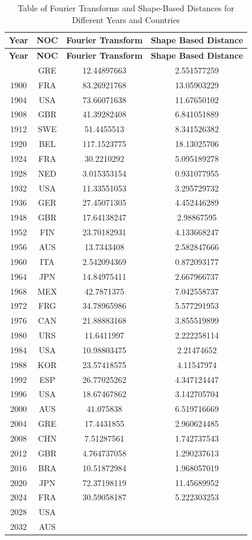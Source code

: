\documentclass[12pt]{article}
\begin{document}
\begin{longtable}{|c|c|c|c|}
\caption{Table of Fourier Transforms and Shape-Based Distances for Different Years and Countries}\\
\hline
\textbf{Year} & \textbf{NOC} & \textbf{Fourier Transform} & \textbf{Shape Based Distance} \\
\hline
\endfirsthead
\hline
\textbf{Year} & \textbf{NOC} & \textbf{Fourier Transform} & \textbf{Shape Based Distance} \\
\hline
\endhead
\hline
\endfoot
1896 & GRE & 12.44897663 & 2.551577259 \\
1900 & FRA & 83.26921768 & 13.05903229 \\
1904 & USA & 73.66071638 & 11.67650102 \\
1908 & GBR & 41.39282408 & 6.841051889 \\
1912 & SWE & 51.4455513 & 8.341526382 \\
1920 & BEL & 117.1523775 & 18.13025706 \\
1924 & FRA & 30.2210292 & 5.095189278 \\
1928 & NED & 3.015353154 & 0.931077955 \\
1932 & USA & 11.33551053 & 3.295729732 \\
1936 & GER & 27.45071305 & 4.452446289 \\
1948 & GBR & 17.64138247 & 2.98867595 \\
1952 & FIN & 23.70182931 & 4.133668247 \\
1956 & AUS & 13.7343408 & 2.582847666 \\
1960 & ITA & 2.542094369 & 0.872093177 \\
1964 & JPN & 14.84975411 & 2.667966737 \\
1968 & MEX & 42.7871375 & 7.042558737 \\
1972 & FRG & 34.78965986 & 5.577291953 \\
1976 & CAN & 21.88883168 & 3.855519899 \\
1980 & URS & 11.6411997 & 2.222258114 \\
1984 & USA & 10.98803475 & 2.21474652 \\
1988 & KOR & 23.57418575 & 4.11547974 \\
1992 & ESP & 26.77025262 & 4.347124447 \\
1996 & USA & 18.67467862 & 3.142705704 \\
2000 & AUS & 41.075838 & 6.519716669 \\
2004 & GRE & 17.4431855 & 2.960624485 \\
2008 & CHN & 7.51287561 & 1.742737543 \\
2012 & GBR & 4.764737058 & 1.290237613 \\
2016 & BRA & 10.51872984 & 1.968057019 \\
2020 & JPN & 72.37198119 & 11.45689952 \\
2024 & FRA & 30.59058187 & 5.222303253 \\
2028 & USA &  &  \\
2032 & AUS &  &  \\
\hline
\end{longtable}
\end{document}
